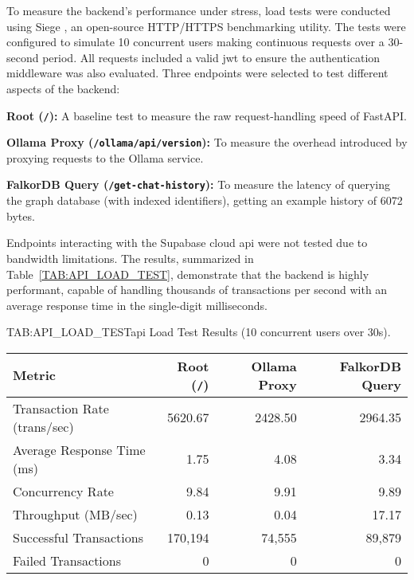 To measure the backend's performance under stress, load tests were conducted using Siege \cite{SIEGE}, an open-source HTTP/HTTPS benchmarking utility. The tests were configured to simulate 10 concurrent users making continuous requests over a 30-second period. All requests included a valid \acs{jwt} to ensure the authentication middleware was also evaluated. Three endpoints were selected to test different aspects of the backend:

\begin{compactitem}[\textbullet]
    \item \textbf{Root (\texttt{/}):} A baseline test to measure the raw request-handling speed of FastAPI.
    \item \textbf{Ollama Proxy (\texttt{/ollama/api/version}):} To measure the overhead introduced by proxying requests to the Ollama service.
    \item \textbf{FalkorDB Query (\texttt{/get-chat-history}):} To measure the latency of querying the graph database (with indexed identifiers), getting an example history of 6072 bytes.
\end{compactitem}

Endpoints interacting with the Supabase cloud \acs{api} were not tested due to bandwidth limitations. The results, summarized in Table~\ref{TAB:API_LOAD_TEST}, demonstrate that the backend is highly performant, capable of handling thousands of transactions per second with an average response time in the single-digit milliseconds.

\begin{table}[Load Test Results]{TAB:API_LOAD_TEST}{\acs{api} Load Test Results (10 concurrent users over 30s).}
    \begin{tabular}{l r r r}
        \hline
        \textbf{Metric} & \textbf{Root (\texttt{/})} & \textbf{Ollama Proxy} & \textbf{FalkorDB Query} \\
        \hline
        Transaction Rate (trans/sec) & 5620.67 & 2428.50 & 2964.35 \\
        Average Response Time (ms) & 1.75 & 4.08 & 3.34 \\
        Concurrency Rate & 9.84 & 9.91 & 9.89 \\
        Throughput (MB/sec) & 0.13 & 0.04 & 17.17 \\
        Successful Transactions & 170,194 & 74,555 & 89,879 \\
        Failed Transactions & 0 & 0 & 0 \\
        \hline
    \end{tabular}
\end{table}